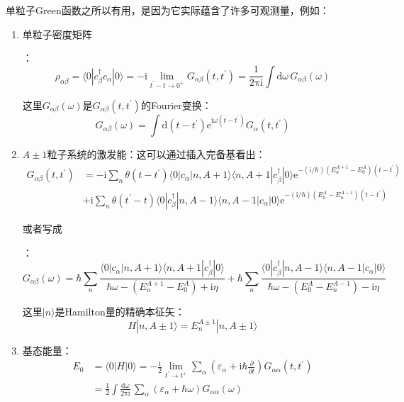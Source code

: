 单粒子Green函数之所以有用，是因为它实际蕴含了许多可观测量，例如：
\begin{enumerate}
\item 单粒子密度矩阵

：
\[
\rho_{\alpha\beta}=\langle0|c^{\dagger}_{\beta}c_{\alpha}|0\rangle=-\mathrm{i}\lim_{t^{\prime}-t\rightarrow0^{+}}G_{\alpha\beta}(t,t^{\prime})=\frac{1}{2\mathrm{\pi}\mathrm{i}}\int\mathrm{d}\omega\,G_{\alpha\beta}(\omega)
\]

这里$G_{\alpha\beta}(\omega)$是$G_{\alpha\beta}(t,t^{\prime})$的Fourier变换：
\[
G_{\alpha\beta}(\omega)=\int\mathrm{d}(t-t^{\prime})\mathrm{e}^{\mathrm{i}\omega(t-t^{\prime})}G_{\alpha}(t,t^{\prime})
\]

\item $A\pm1$粒子系统的激发能：这可以通过插入完备基看出：
\begin{align*}
G_{\alpha\beta}(t,t^{\prime}) & =-\mathrm{i}\sum_{n}\theta(t-t^{\prime})\langle0|c_{\alpha}|n,A+1\rangle\langle n,A+1|c^{\dagger}_{\beta}|0\rangle\mathrm{e}^{-(\mathrm{i}/\hbar)(E^{A+1}_{n}-E^{A}_{0})(t-t^{\prime})}\\
 & +\mathrm{i}\sum_{n}\theta(t^{\prime}-t)\langle0|c^{\dagger}_{\beta}|n,A-1\rangle\langle n,A-1|c_{\alpha}|0\rangle\mathrm{e}^{-(\mathrm{i}/\hbar)(E^{A}_{0}-E^{A-1}_{n})(t-t^{\prime})}
\end{align*}

或者写成

：
\[
G_{\alpha\beta}(\omega)=\hbar\sum_{n}\frac{\langle0|c_{\alpha}|n,A+1\rangle\langle n,A+1|c^{\dagger}_{\beta}|0\rangle}{\hbar\omega-(E^{A+1}_{n}-E^{A}_{0})+\mathrm{i}\eta}+\hbar\sum_{n}\frac{\langle0|c^{\dagger}_{\beta}|n,A-1\rangle\langle n,A-1|c_{\alpha}|0\rangle}{\hbar\omega-(E^{A}_{0}-E^{A-1}_{n})-\mathrm{i}\eta}
\]

这里$|n\rangle$是Hamilton量的精确本征矢：
\[
H|n,A\pm1\rangle=E^{A\pm1}_{n}|n,A\pm1\rangle
\]

\item 基态能量：
\begin{align}
E_{0} & =\langle0|H|0\rangle=-\frac{\mathrm{i}}{2}\lim_{t^{\prime}\rightarrow t^{+}}\sum_{\alpha}(\varepsilon_{\alpha}+\mathrm{i}\hbar\frac{\partial}{\partial t})G_{\alpha\alpha}(t,t^{\prime})\nonumber \\
 & =\frac{1}{2}\int\frac{\mathrm{d}\omega}{2\mathrm{\pi}\mathrm{i}}\,\sum_{\alpha}(\varepsilon_{\alpha}+\hbar\omega)G_{\alpha\alpha}(\omega)\label{eq:F_7}
\end{align}


\end{enumerate}
